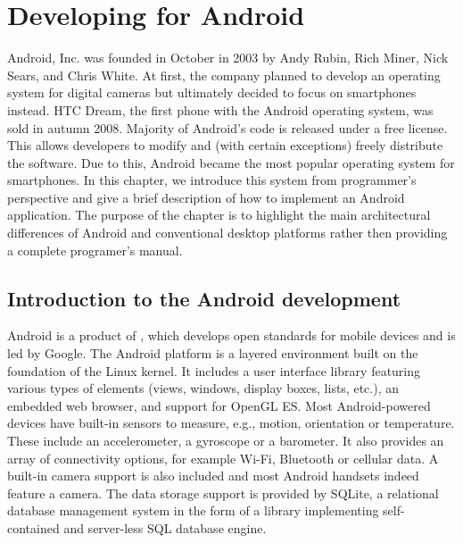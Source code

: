 \chapter{Developing for Android}
\label{chap:android}

Android, Inc\@. was founded in October in 2003 by Andy Rubin, Rich Miner, Nick Sears, and Chris White. 
At first, the company planned to develop an operating system for digital cameras %
but ultimately %
decided to focus on smartphones instead. %
HTC Dream, the first phone with the Android operating system, was sold in autumn 2008.
Majority of Android's code is released under a free license. 
This allows developers to modify and (with certain exceptions) freely distribute the software.
Due to this, Android became the most popular operating system for smartphones.
In this chapter, we introduce this system from programmer's perspective and give a brief description of how to implement an Android application.
The purpose of the chapter is to highlight the main architectural differences of Android and conventional desktop platforms rather then providing a complete programer's manual. 

\section{Introduction to the Android development}

Android is a product of , which develops open standards for mobile devices and is led by Google.
The Android platform is a layered environment built on the foundation of the Linux kernel.
It includes a user interface library featuring various types of elements (views, windows, display boxes, lists, etc.),  
an embedded web browser, and support for OpenGL ES.
Most Android-powered devices have built-in sensors to measure, e.g., motion, orientation or temperature. 
These include an accelerometer, a gyroscope or a barometer.
It also provides an array of connectivity options, for example Wi-Fi, Bluetooth or cellular data.
A built-in camera support is also included and most Android handsets indeed feature a camera. 
The data storage support is provided by SQLite, a relational database management system in the form of a library implementing self-contained and server-less SQL database engine.
 
